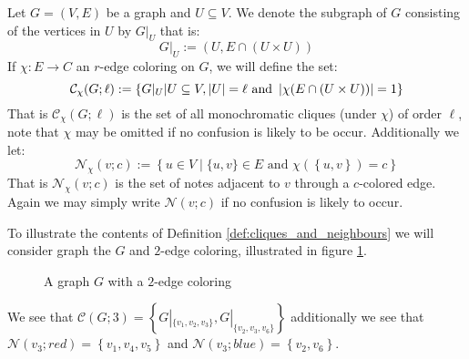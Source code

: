 \begin{definition}\label{def:cliques_and_neighbours}
	Let $G = (V, E)$ be a graph and $U \subseteq V$. We denote the subgraph of $G$ consisting of the vertices in $U$ by $G|_U$ that is:
	\begin{equation*}
		G|_U := \left(U, E \cap (U \times U)\right)
	\end{equation*}
	If $\chi: E \to C$ an $r$-edge coloring on $G$, we will define the set:
	\begin{equation*}
		\mathcal{C}_{\chi}(G; \ell) := \left\{ G|_{U} \middle| U \subseteq V, \left\lvert U\right\rvert  = \ell \text{ and }  \left\lvert\chi(E \cap \left(U \times U)\right)\right\rvert = 1 \right\}
	\end{equation*}
	That is $\mathcal{C}_{\chi}(G; \ell)$ is the set of all monochromatic cliques (under $\chi$) of order $\ell$, note that $\chi$ may be omitted if no confusion is likely to be occur. Additionally we let:
	\begin{equation*}
		\mathcal{N}_{\chi}(v; c) := \left\{u \in V \middle| \{u, v\} \in E \text{ and } \chi\left(\left\{u, v\right\}\right) = c\right\}
	\end{equation*}
	That is $\mathcal{N}_{\chi}(v; c)$ is the set of notes adjacent to $v$ through a $c$-colored edge. Again we may simply write $\mathcal{N}(v; c)$ if no confusion is likely to occur.
\end{definition}
\begin{example}\label{exmp:cliques_and_neighbours}
	To illustrate the contents of Definition \ref{def:cliques_and_neighbours} we will consider graph the $G$ and  $2$-edge coloring, illustrated in figure \ref{fig:cliques_and_neighbours}.
	\begin{figure}[H]
		\centering
		\caption{A graph $G$ with a $2$-edge coloring}
		\label{fig:cliques_and_neighbours}
	\end{figure}
	We see that $\mathcal{C}(G; 3) = \left\{G|_{\{v_1, v_2, v_3\}}, G|_{\{v_2, v_3, v_{6}\}}\right\}$ additionally we see that $\mathcal{N}(v_3; red) = \left\{v_1, v_{4}, v_5\right\}$ and $\mathcal{N}(v_3; blue) = \left\{v_2, v_{6}\right\}$.
\end{example}






